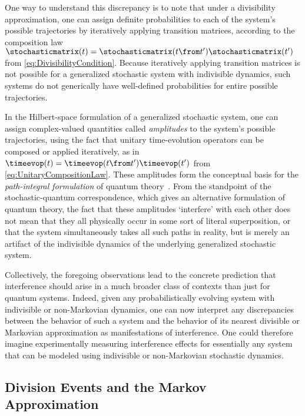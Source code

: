 \documentclass[12pt,english,prl,superscriptaddress,nobibnotes,nofootinbib]{revtex4-2}
\let\originalleft\left
\let\originalright\right
\renewcommand{\left}{\mathopen{}\mathclose\bgroup\originalleft}
\renewcommand{\right}{\aftergroup\egroup\originalright}
\begin{document}
One way to understand this discrepancy is to note that under a divisibility
approximation, one can assign definite probabilities to each of the
system's possible trajectories by iteratively applying transition
matrices, according to the composition law $\stochasticmatrix\left(t\right)=\stochasticmatrix\left(t\from t^{\prime}\right)\stochasticmatrix\left(t^{\prime}\right)$
from \eqref{eq:DivisibilityCondition}. Because iteratively applying
transition matrices is not possible for a generalized stochastic system
with indivisible dynamics, such systems do not generically have well-defined
probabilities for entire possible trajectories.

In the Hilbert-space formulation of a generalized stochastic system,
one can assign complex-valued quantities called \emph{amplitudes}
to the system's possible trajectories, using the fact that unitary
time-evolution operators can be composed or applied iteratively, as
in $\timeevop\left(t\right)=\timeevop\left(t\from t^{\prime}\right)\timeevop\left(t^{\prime}\right)$
from \eqref{eq:UnitaryCompositionLaw}. These amplitudes form the
conceptual basis for the \emph{path-integral formulation} of quantum
theory~\citep{Dirac:1933tliqm,Feynman:1942tpolaiqm,Feynman:1948statnrqm}.
From the standpoint of the stochastic-quantum correspondence, which
gives an alternative formulation of quantum theory, the fact that
these amplitudes \textquoteleft interfere\textquoteright{} with each
other does not mean that they all physically occur in some sort of
literal superposition, or that the system simultaneously takes all
such paths in reality, but is merely an artifact of the indivisible
dynamics of the underlying generalized stochastic system.

Collectively, the foregoing observations lead to the concrete prediction
that interference should arise in a much broader class of contexts
than just for quantum systems. Indeed, given any probabilistically
evolving system with indivisible or non-Markovian dynamics, one can
now interpret any discrepancies between the behavior of such a system
and the behavior of its nearest divisible or Markovian approximation
as manifestations of interference. One could therefore imagine experimentally
measuring interference effects for essentially any system that can
be modeled using indivisible or non-Markovian stochastic dynamics.

\subsection{Division Events and the Markov Approximation\label{subsec:Division-Events-and-the-Markov-Approximation}}
\end{document}
